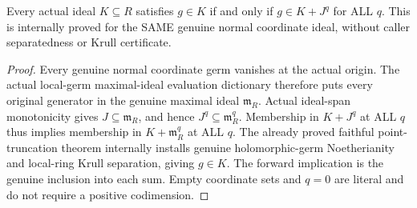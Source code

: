 \begin{lemma}
\label{hir:submersion-projection-colon-normal-power-separation}
\leanok
{}
Every actual ideal $K\subseteq R$ satisfies $g\in K$ if and only if
$g\in K+J^q$ for ALL $q$. This is internally proved for the SAME genuine
normal coordinate ideal, without caller separatedness or Krull certificate.
\end{lemma}
\begin{proof}
Every genuine normal coordinate germ vanishes at the actual origin. The
actual local-germ maximal-ideal evaluation dictionary therefore puts every
original generator in the genuine maximal ideal $\mathfrak m_R$. Actual
ideal-span monotonicity gives $J\subseteq\mathfrak m_R$, and hence
$J^q\subseteq\mathfrak m_R^q$. Membership in $K+J^q$ at ALL $q$ thus implies
membership in $K+\mathfrak m_R^q$ at ALL $q$. The already proved faithful
point-truncation theorem internally installs genuine holomorphic-germ
Noetherianity and local-ring Krull separation, giving $g\in K$. The forward
implication is the genuine inclusion into each sum. Empty coordinate sets
and $q=0$ are literal and do not require a positive codimension.
\end{proof}

